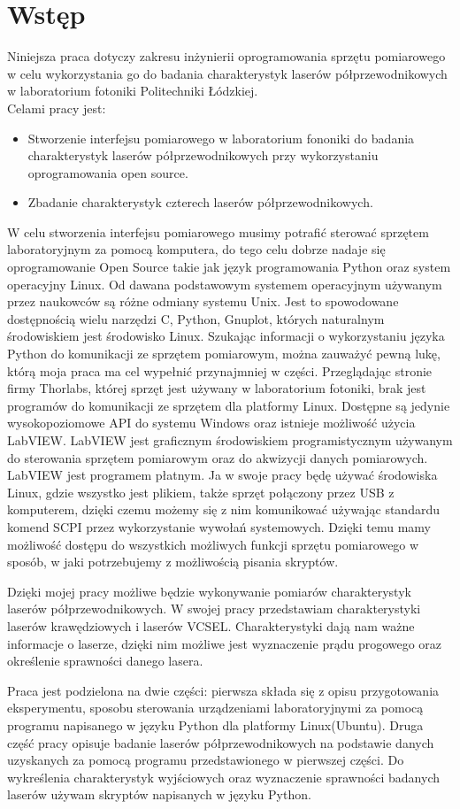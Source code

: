 \chapter{Wstęp} \label{rozdz.wstep}
Niniejsza praca dotyczy zakresu inżynierii oprogramowania sprzętu pomiarowego w celu wykorzystania go do badania charakterystyk
laserów półprzewodnikowych w laboratorium fotoniki Politechniki Łódzkiej. \\
Celami pracy jest:
\begin{itemize}
\item Stworzenie interfejsu pomiarowego w laboratorium fononiki do badania charakterystyk laserów półprzewodnikowych przy wykorzystaniu oprogramowania
open source.
\item Zbadanie charakterystyk czterech laserów półprzewodnikowych.
\end{itemize}
W celu stworzenia interfejsu pomiarowego musimy potrafić sterować sprzętem laboratoryjnym za pomocą komputera, do tego celu dobrze nadaje się oprogramowanie
Open Source takie jak język programowania Python oraz system operacyjny Linux.
Od dawana podstawowym systemem operacyjnym używanym przez naukowców są różne odmiany systemu Unix.
Jest to spowodowane dostępnością wielu narzędzi C, Python, Gnuplot, których naturalnym środowiskiem jest środowisko Linux.
Szukając informacji o wykorzystaniu języka Python do komunikacji ze sprzętem pomiarowym, można zauważyć pewną lukę,
którą moja praca ma cel wypełnić przynajmniej w części.
Przeglądając stronie firmy Thorlabs, której sprzęt jest używany w laboratorium fotoniki,
brak jest programów do komunikacji ze sprzętem dla platformy Linux.
Dostępne są jedynie wysokopoziomowe API do systemu Windows oraz istnieje możliwość użycia LabVIEW.
LabVIEW jest graficznym środowiskiem programistycznym używanym do sterowania sprzętem pomiarowym
oraz do akwizycji danych pomiarowych. LabVIEW jest programem płatnym. Ja w swoje pracy będę używać środowiska Linux,
gdzie wszystko jest plikiem, także sprzęt połączony przez USB z komputerem, dzięki czemu możemy się z nim komunikować
używając standardu komend SCPI przez wykorzystanie wywołań systemowych. Dzięki temu mamy możliwość dostępu do wszystkich możliwych funkcji sprzętu
pomiarowego w sposób, w jaki potrzebujemy z możliwością pisania skryptów.

Dzięki mojej pracy możliwe będzie wykonywanie pomiarów charakterystyk laserów półprzewodnikowych.
W swojej pracy przedstawiam charakterystyki laserów krawędziowych i laserów VCSEL.
Charakterystyki dają nam ważne informacje o laserze, dzięki nim możliwe jest wyznaczenie prądu progowego oraz
określenie sprawności danego lasera.

Praca jest podzielona na dwie części: pierwsza składa się z opisu przygotowania eksperymentu, sposobu sterowania urządzeniami laboratoryjnymi
za pomocą programu napisanego w języku Python dla platformy Linux(Ubuntu).
 Druga część pracy opisuje badanie laserów półprzewodnikowych na podstawie danych uzyskanych
za pomocą programu przedstawionego w pierwszej części. Do wykreślenia charakterystyk wyjściowych oraz wyznaczenie sprawności
badanych laserów używam skryptów napisanych w języku Python.